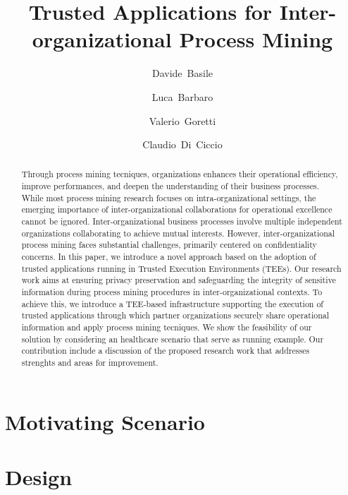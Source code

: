 \documentclass[runningheads]{llncs}
\begin{document}
%
\title{
}
%
%
\author{Davide~Basile \and
Luca~Barbaro \and
Valerio~Goretti \and Claudio~Di~Ciccio}
%
%
%
\title{Trusted Applications for Inter-organizational Process Mining}
\maketitle

\begin{abstract}
 Through process mining tecniques, organizations enhances their operational efficiency, improve performances, and deepen the understanding of their business processes. While most process mining research focuses on intra-organizational settings, the emerging importance of inter-organizational collaborations for operational excellence cannot be ignored. Inter-organizational business processes involve multiple independent organizations collaborating to achieve mutual interests. However, inter-organizational process mining faces substantial challenges, primarily centered on confidentiality concerns. In this paper, we introduce a novel approach based on the adoption of trusted applications running in Trusted Execution Environments (TEEs). Our research work aims at ensuring privacy preservation and safeguarding the integrity of sensitive information during process mining procedures in inter-organizational contexts. To achieve this, we introduce a TEE-based infrastructure supporting the execution of trusted applications through which partner organizations securely share operational information and apply process mining tecniques. We show the feasibility of our solution by considering an healthcare scenario that serve as running example. Our contribution include a discussion of the proposed research work that addresses strenghts and areas for improvement.
\end{abstract}





\section{Motivating Scenario}\label{sec:motivating}

\section{Design}\label{sec:design}







\end{document}
